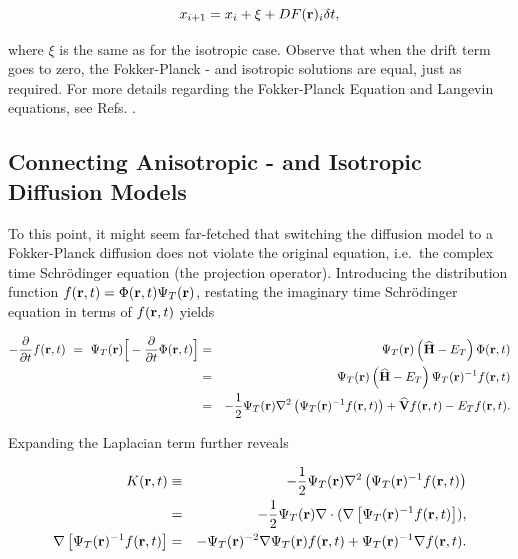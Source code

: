 \begin{equation}
 \label{eq:langevinSolFP}
 x_{i+1} = x_i + \xi + DF(\mathbf{r})_i\delta t,
\end{equation}

where $\xi$ is the same as for the isotropic case. Observe that when the drift term goes to zero, the Fokker-Planck - and isotropic solutions are equal, just as required. For more details regarding the Fokker-Planck Equation and Langevin equations, see Refs. \cite{Gardiner:2004bk, risken1989fpe, langevin}.


\subsection{Connecting Anisotropic - and Isotropic Diffusion Models}
\label{sec:ConnectAnisIs}

To this point, it might seem far-fetched that switching the diffusion model to a Fokker-Planck diffusion does not violate the original equation, i.e.~the complex time Schrödinger equation (the projection operator). Introducing the distribution function $f(\mathbf{r}, t) = \Phi(\mathbf{r}, t)\Psi_T(\mathbf{r})$, restating the imaginary time Schrödinger equation in terms of $f(\mathbf{r}, t)$ yields

\begin{eqnarray}
-\frac{\partial}{\partial t}f(\mathbf{r}, t)\,\, = \,\,\Psi_T(\mathbf{r})\Big[-\frac{\partial}{\partial t}\Phi(\mathbf{r}, t)\Big] &=& \Psi_T(\mathbf{r})\left({\bf\widehat{H}} - E_T\right)\Phi(\mathbf{r}, t) \nonumber\\
         &=& \Psi_T(\mathbf{r})\left({\bf\widehat{H}} - E_T\right)\Psi_T(\mathbf{r})^{-1}f(\mathbf{r}, t) \label{eq:impSamplRaw}\\
         &=& -\frac{1}{2}\Psi_T(\mathbf{r})\nabla^2 \left(\Psi_T(\mathbf{r})^{-1}f(\mathbf{r}, t)\right) + {\bf\widehat{V}}f(\mathbf{r}, t) - E_Tf(\mathbf{r},t).\nonumber
\end{eqnarray}

Expanding the Laplacian term further reveals

\begin{eqnarray}
K(\mathbf{r}, t) &\equiv& -\frac{1}{2}\Psi_T(\mathbf{r})\nabla^2 \left(\Psi_T(\mathbf{r})^{-1}f(\mathbf{r}, t)\right) \nonumber\\
 &=& -\frac{1}{2}\Psi_T(\mathbf{r})\nabla\cdot (\nabla\left[\Psi_T(\mathbf{r})^{-1}f(\mathbf{r}, t)\right]), \\
\nabla\left[\Psi_T(\mathbf{r})^{-1}f(\mathbf{r}, t)\right] &=& -\Psi_T(\mathbf{r})^{-2}\nabla \Psi_T(\mathbf{r}) f(\mathbf{r}, t) + \Psi_T(\mathbf{r})^{-1}\nabla f(\mathbf{r}, t).
\end{eqnarray}

